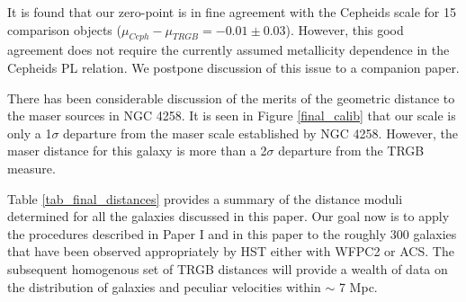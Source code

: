 \documentclass[11pt,preprint2]{aastex}
\begin{document}
It is found that our zero-point is in fine agreement with the Cepheids scale for 15 comparison objects ($\mu_{Ceph}-\mu_{TRGB}=-0.01 \pm 0.03$).
However, this good agreement  does not require the currently assumed metallicity dependence in the Cepheids PL relation. We postpone discussion of this issue to a companion paper.

There has been considerable discussion of the merits of the geometric distance to the maser sources in NGC 4258. It is seen in Figure \ref{final_calib} that our scale is only a 1$\sigma$ departure from the maser scale established by NGC 4258. However, the maser distance for this galaxy is more than a 2$\sigma$ departure from the TRGB measure.

Table \ref{tab_final_distances} provides a summary of the distance moduli determined for all the galaxies discussed in this paper. Our goal now is to apply the procedures described in Paper I and in this paper to the roughly 300 galaxies that have been observed appropriately by HST either with WFPC2 or ACS. The subsequent homogenous set of TRGB distances will provide a wealth of data on the distribution of galaxies and peculiar velocities within $\sim$ 7 Mpc.
\end{document}
